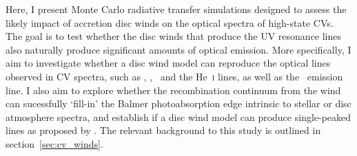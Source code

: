 

\nocite{groot2004}
\nocite{beuermann1990}
\nocite{beuermann1992}
\nocite{higginbottom2013}

Here, I present Monte Carlo radiative transfer simulations designed
to assess the likely impact of accretion disc winds on the
optical spectra of high-state CVs. The goal is to
test whether the disc winds that produce the UV
resonance lines also naturally produce significant amounts of  
optical emission. More specifically, I aim to investigate whether a 
disc wind model can reproduce the optical lines observed in CV spectra,
such as \ha, \hb, \heiiopt\ and the He~\textsc{i} lines, as well as
the \heiiuv\ emission line. I also aim to explore whether the recombination
continuum from the wind can sucessfully `fill-in' the Balmer photoabsorption
edge intrinsic to stellar or disc atmosphere spectra, and establish
if a disc wind model can produce single-peaked lines as proposed
by \cite[][hereafter referred to collectively as MC96]{MC96,MC97}.
The relevant background to this study is outlined in section~\ref{sec:cv_winds}.

